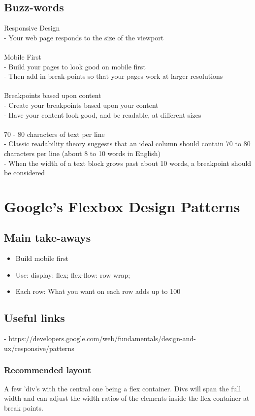 \documentclass[]{article}
\begin{document}
\subsection{Buzz-words}
Responsive Design\\
 - Your web page responds to the size of the viewport\\
 \\
Mobile First\\
 - Build your pages to look good on mobile first\\
 - Then add in break-points so that your pages work at larger resolutions\\
 \\
Breakpoints based upon content\\
 - Create your breakpoints based upon your content\\
 - Have your content look good, and be readable, at different sizes\\
 \\
70 - 80 characters of text per line\\
 - Classic readability theory suggests that an ideal column should contain 70 to 80 characters per line (about 8 to 10 words in English)\\
 - When the width of a text block grows past about 10 words, a breakpoint should be considered\\
 
\section{Google's Flexbox Design Patterns}
\subsection{Main take-aways}
\begin{itemize}
	\item Build mobile first 
	\item Use: 
	\subitem display: flex; 
	\subitem flex-flow: row wrap; 
	\item Each row: 
	\subitem What you want on each row adds up to 100%
\end{itemize}
\subsection{Useful links}
 - https://developers.google.com/web/fundamentals/design-and-ux/responsive/patterns
 
 \subsubsection{Recommended layout}
 A few 'div's with the central one being a flex container.  Divs will span the full width and can adjust the width ratios of the elements inside the flex container at break points.
\end{document}
